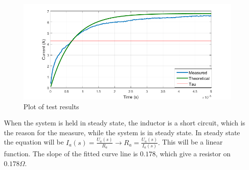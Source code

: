 \begin{figure}[H]
 	\centering
  \includegraphics[width=1\textwidth]{figures/motor2ndExersize}
	\caption{Plot of test results}
\end{figure}

When the system is held in steady state, the inductor is a short circuit, which is the reason for the measure, while the system is in steady state. In steady state the equation will be $I_a (s) = \frac{U_a (s)}{R_a} \longrightarrow R_a = \frac{U_a (s)}{I_a (s)}.$ This will be a linear function. The slope of the fitted curve line is $0.178$, which give a resistor on $0.178 \Omega$.